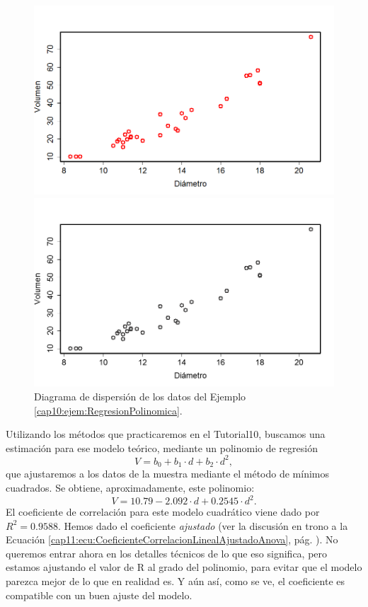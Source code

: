 \begin{ejemplo}
\begin{figure}[htbp]
\begin{center}
\begin{enColor}
\includegraphics[width=14cm]{../fig/Cap10-RegresionPolinomica01.png}
\end{enColor}
\begin{bn}
\includegraphics[width=14cm]{../fig/Cap10-RegresionPolinomica01-bn.png}
\end{bn}
\caption{Diagrama de dispersión de los datos del Ejemplo \ref{cap10:ejem:RegresionPolinomica}.}
\label{cap10:fig:RegresionPolinomica01}
\end{center}
\end{figure}

Utilizando los métodos que practicaremos en el Tutorial10, buscamos una estimación para ese modelo teórico, mediante un polinomio de regresión
\[V=b_0+b_1\cdot d+b_2\cdot d^2,\]
que ajustaremos a los datos de la muestra mediante el método de mínimos cuadrados. Se obtiene, aproximadamente, este polinomio:
\[ V=10.79-2.092\cdot d+0.2545\cdot d^2.\]
El coeficiente de correlación para este modelo cuadrático viene dado por $R^2=0.9588$. Hemos dado el coeficiente {\em ajustado} (ver la discusión en trono a la Ecuación \ref{cap11:ecu:CoeficienteCorrelacionLinealAjustadoAnova}, pág. \pageref{cap11:ecu:CoeficienteCorrelacionLinealAjustadoAnova}). No queremos entrar ahora en los detalles técnicos de lo que eso significa, pero estamos ajustando el valor de R al grado del polinomio, para evitar que el modelo parezca mejor de lo que en realidad es. Y aún así, como se ve, el coeficiente es compatible con un buen ajuste del modelo.


\end{ejemplo}
